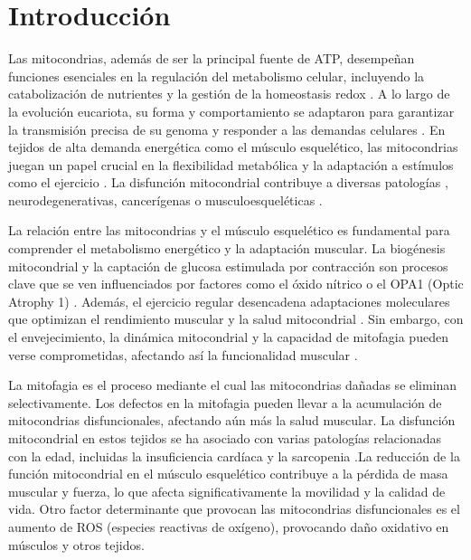 
\section{Introducción}

Las mitocondrias, además de ser la principal fuente de ATP, desempeñan funciones esenciales en la regulación del metabolismo celular, incluyendo la catabolización de nutrientes y la gestión de la homeostasis redox \cite{Spinelli2018}. A lo largo de la evolución eucariota, su forma y comportamiento se adaptaron para garantizar la transmisión precisa de su genoma y responder a las demandas celulares \cite{Friedman2014}. En tejidos de alta demanda energética como el músculo esquelético, las mitocondrias juegan un papel crucial en la flexibilidad metabólica y la adaptación a estímulos como el ejercicio \cite{Memme2021, Smith2023}. La disfunción mitocondrial contribuye a diversas patologías \cite{QuintanaCabrera2023}, neurodegenerativas, cancerígenas \cite{Chan2020} o musculoesqueléticas \cite{Liu2017}.

La relación entre las mitocondrias y el músculo esquelético es fundamental para comprender el metabolismo energético y la adaptación muscular. La biogénesis mitocondrial y la captación de glucosa estimulada por contracción son procesos clave que se ven influenciados por factores como el óxido nítrico \cite{McConell2008} o el OPA1 (Optic Atrophy 1) \cite{Noone2022}. Además, el ejercicio regular desencadena adaptaciones moleculares que optimizan el rendimiento muscular y la salud mitocondrial \cite{Hargreaves2020,Egan2013}. Sin embargo, con el envejecimiento, la dinámica mitocondrial y la capacidad de mitofagia pueden verse comprometidas, afectando así la funcionalidad muscular \cite{Hood2019,Leudec}. 


La mitofagia es el proceso mediante el cual las mitocondrias dañadas se eliminan selectivamente. Los defectos en la mitofagia pueden llevar a la acumulación de mitocondrias disfuncionales, afectando aún más la salud muscular. \cite{Leudec}
La disfunción mitocondrial \cite{chen} en estos tejidos se ha asociado con varias patologías relacionadas con la edad, incluidas la insuficiencia cardíaca y la sarcopenia \cite{Boengler} .La reducción de la función mitocondrial en el músculo esquelético contribuye a la pérdida de masa muscular y fuerza, lo que afecta significativamente la movilidad y la calidad de vida.
Otro factor determinante que provocan las mitocondrias disfuncionales es el aumento de ROS (especies reactivas de oxígeno), provocando daño oxidativo en músculos y otros tejidos. \cite{java}

